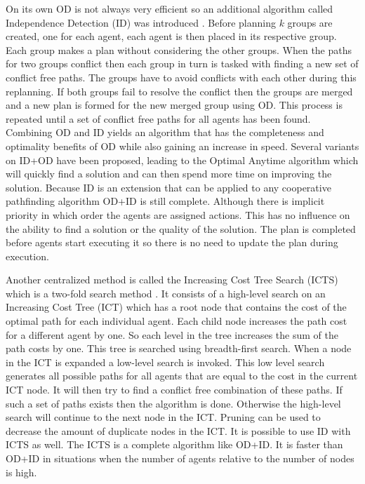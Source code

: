 On its own OD is not always very efficient so an additional algorithm called
Independence Detection (ID) was introduced \cite{standley2010}. Before planning
$k$ groups are created, one for each agent, each agent is then placed in its
respective group. Each group makes a plan without considering the other groups.
When the paths for two groups conflict then each group in turn is tasked with
finding a new set of conflict free paths. The groups have to avoid conflicts
with each other during this replanning. If both groups fail to resolve the 
conflict
then the groups are merged and a new plan is formed for the new merged group
using OD. This process is repeated until a set of conflict free paths for all
agents has been found. Combining OD and ID yields an algorithm that has the
completeness and optimality benefits of OD while also gaining an increase in
speed. Several variants on
ID+OD have been proposed, leading to the Optimal Anytime algorithm
\cite{standley2011} which will quickly find a solution and can then spend more
time on improving the solution. Because ID is an extension that can be applied
to any cooperative pathfinding algorithm OD+ID is still complete. Although
there is implicit priority in which order the agents are assigned actions. This
has no influence on the ability to find a solution or the quality of the
solution. The plan is completed before agents start executing it so there is
no need to update the plan during execution.

Another centralized method is called the Increasing Cost Tree Search (ICTS)
which is a
two-fold search method \cite{sharon2013}. It consists of a high-level search on
an Increasing Cost Tree (ICT) which has a root node that contains the cost of 
the optimal
path for each individual agent. Each child node increases the path cost
for a different agent by one. So each level in the tree increases the sum of 
the path
costs by one. This tree is searched using breadth-first search. When a node in
the ICT is expanded a low-level search is invoked. This low level search
generates all possible paths for all agents that are equal to the cost in the
current
ICT node. It will then try to find a conflict free combination of these paths.
If such a set of paths exists then the algorithm is done. Otherwise the
high-level search will continue to the next node in the ICT. Pruning can be
used to decrease the amount of duplicate nodes in the ICT. It is possible
to use ID with ICTS as well. The ICTS is a complete algorithm like OD+ID. It is
faster than OD+ID in situations when the number of agents relative to the
number of nodes is high.

